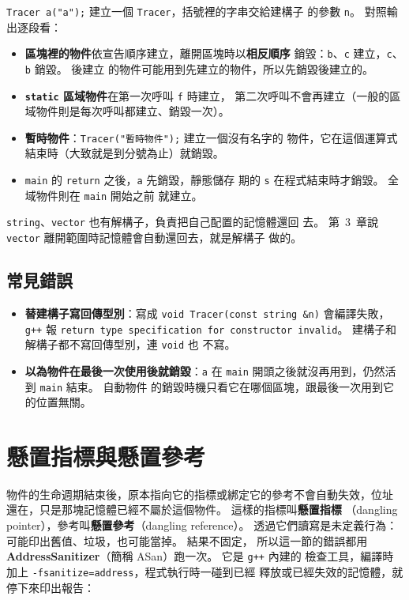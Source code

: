 \texttt{Tracer a("a");} 建立一個 \texttt{Tracer}，括號裡的字串交給建構子
的參數 \texttt{n}。 對照輸出逐段看：

\begin{itemize}
\item \textbf{區塊裡的物件}依宣告順序建立，離開區塊時以\textbf{相反順序}
銷毀：\texttt{b}、\texttt{c} 建立，\texttt{c}、\texttt{b} 銷毀。 後建立
的物件可能用到先建立的物件，所以先銷毀後建立的。
\item \textbf{\texttt{static} 區域物件}在第一次呼叫 \texttt{f} 時建立，
第二次呼叫不會再建立（一般的區域物件則是每次呼叫都建立、銷毀一次）。
\item \textbf{暫時物件}：\texttt{Tracer("暫時物件");} 建立一個沒有名字的
物件，它在這個運算式結束時（大致就是到分號為止）就銷毀。
\item \texttt{main} 的 \texttt{return} 之後，\texttt{a} 先銷毀，靜態儲存
期的 \texttt{s} 在程式結束時才銷毀。 全域物件則在 \texttt{main} 開始之前
就建立。
\end{itemize}

\texttt{string}、\texttt{vector} 也有解構子，負責把自己配置的記憶體還回
去。 第~3~章說 \texttt{vector} 離開範圍時記憶體會自動還回去，就是解構子
做的。

\subsection{常見錯誤}

\begin{itemize}
\item \textbf{替建構子寫回傳型別}：寫成 \texttt{void Tracer(const string
\&n)} 會編譯失敗，\texttt{g++} 報 \texttt{return type specification for
constructor invalid}。 建構子和解構子都不寫回傳型別，連 \texttt{void} 也
不寫。
\item \textbf{以為物件在最後一次使用後就銷毀}：\texttt{a} 在
\texttt{main} 開頭之後就沒再用到，仍然活到 \texttt{main} 結束。 自動物件
的銷毀時機只看它在哪個區塊，跟最後一次用到它的位置無關。
\end{itemize}

\section{懸置指標與懸置參考}
\label{sec:dangling}

物件的生命週期結束後，原本指向它的指標或綁定它的參考不會自動失效，位址
還在，只是那塊記憶體已經不屬於這個物件。 這樣的指標叫\textbf{懸置指標}
（dangling pointer），參考叫\textbf{懸置參考}（dangling reference）。
透過它們讀寫是未定義行為：可能印出舊值、垃圾，也可能當掉。 結果不固定，
所以這一節的錯誤都用 \textbf{AddressSanitizer}（簡稱 ASan）跑一次。 它是 \texttt{g++} 內建的
檢查工具，編譯時加上 \texttt{-fsanitize=address}，程式執行時一碰到已經
釋放或已經失效的記憶體，就停下來印出報告：

